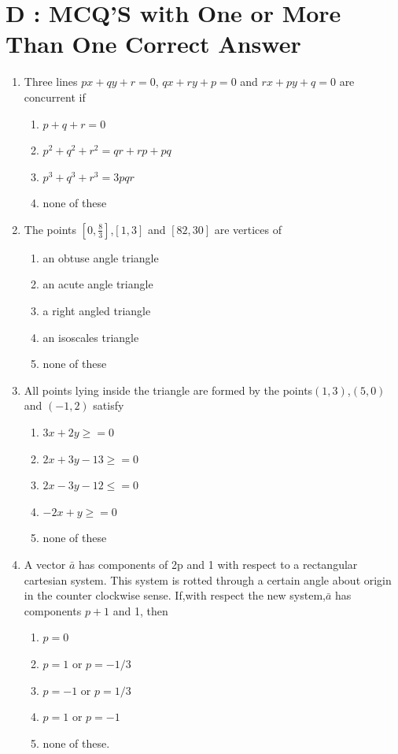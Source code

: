 \documentclass[12pt]{article}
\begin{document}
\section*{D   :  MCQ'S with One or More Than One Correct Answer}
\begin{enumerate}

\item Three lines $px+qy+r=0$, $qx+ry+p=0$ and $rx+py+q=0$ are concurrent if 
\begin{enumerate}
\item $p+q+r=0$
\item $p^2+q^2+r^2=qr+rp+pq$
\item $p^3+q^3+r^3=3pqr$
\item none of these
\end{enumerate}
\item The points $[0,\frac{8}{3}]$,$[1,3]$ and $[82,30]$ are vertices of
\begin{enumerate}
\item an obtuse angle triangle
\item an acute angle triangle 
\item  a right angled triangle
\item  an isoscales triangle
\item none of these
\end{enumerate}
\item All points lying inside the triangle are formed by the points$(1,3)$,$(5,0)$ and $(-1,2)$ satisfy
\begin{enumerate}
\item  $3x+2y\ge=0$
\item $2x+3y-13\ge=0$
\item  $2x-3y-12\le=0$
\item $-2x+y\ge=0$
\item none of these
\end{enumerate}
\item A vector $\bar{a}$ has components of 2p and 1 with respect to a rectangular cartesian system. This system is rotted through a certain angle about origin in the counter clockwise sense. If,with respect the new system,$\bar{a}$ has components $p+1$ and 1, then
\begin{enumerate}
\item $p=0$  
\item  $p=1$ or $p=-1/3$  
\item $p=-1$ or $p=1/3$ 
\item  $p=1$ or $p=-1$
\item none of these.

\end{enumerate}
\end{enumerate}
\end{document}
